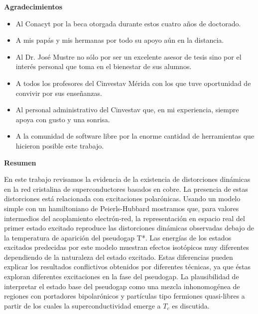 
\cleardoublepage
{}
{}

\begin{center}
\textbf{\large Agradecimientos}
\end{center}
\vspace{3cm}

\begin{itemize}
    \item Al Conacyt por la beca otorgada durante estos cuatro años de doctorado.
    \item A mis pap\'{a}s y mis hermanas por todo su apoyo a\'{u}n en la distancia.
    \item Al Dr. Jos\'{e} Mustre no s\'{o}lo por ser un excelente asesor de tesis sino por el inter\'{e}s personal que toma en el bienestar de sus alumnos.
    \item A todos los profesores del Cinvestav M\'{e}rida con los que tuve oportunidad de convivir por sus enseñanzas.
    \item Al personal administrativo del Cinvestav que, en mi experiencia, siempre apoya con gusto y una sonrisa.
    \item A la comunidad de software libre por la enorme cantidad de herramientas que hicieron posible este trabajo.
\end{itemize}


\cleardoublepage
{}
{}
\begin{center}
\textbf{\large Resumen}
\end{center}
En este trabajo revisamos la evidencia de la existencia de distorciones din\'{a}micas en la red cristalina de superconductores basados en cobre. La presencia de estas distorciones est\'{a} relacionada con excitaciones polar\'{o}nicas. Usando un modelo simple con un hamiltoniano de Peierls-Hubbard mostramos que, para valores intermedios del acoplamiento electr\'{o}n-red, la representaci\'{o}n en espacio real del primer estado excitado reproduce las distorciones din\'{a}micas observadas debajo de la temperatura de aparici\'{o}n del pseudogap T*. Las energ\'{i}as de los estados excitados predecidas por este modelo muestran efectos isot\'{o}picos muy diferentes dependiendo de la naturaleza del estado excitado. Estas diferencias pueden explicar los resultados conflictivos obtenidos por diferentes t\'{e}cnicas, ya que \'{e}stas exploran diferentes excitaciones en la fase del pseudogap. La plausibilidad de interpretar el estado base del pseudogap como una mezcla inhonomog\'{e}nea de regiones con portadores bipolar\'{o}nicos y part\'{i}culas tipo fermiones quasi-libres a partir de los cuales la superconductividad emerge a $T_c$ es discutida.

